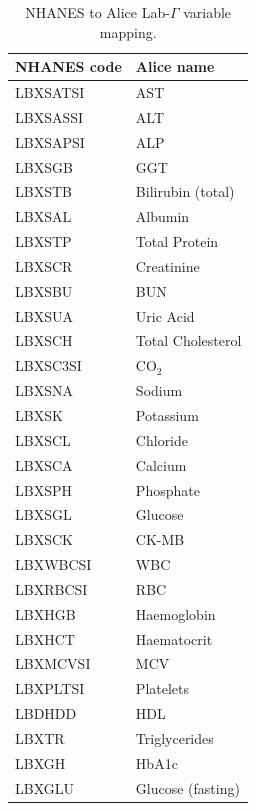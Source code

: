 \documentclass[aps,pre,twocolumn,superscriptaddress,floatfix]{revtex4-2}
\begin{document}
\begin{table}[h]
\centering
\caption{NHANES to Alice Lab-$\Gamma$ variable mapping.}
\label{tab:nhanes-map}
\begin{tabular}{ll}
\toprule
NHANES code & Alice name \\
\midrule
LBXSATSI & AST \\
LBXSASSI & ALT \\
LBXSAPSI & ALP \\
LBXSGB   & GGT \\
LBXSTB   & Bilirubin (total) \\
LBXSAL   & Albumin \\
LBXSTP   & Total Protein \\
LBXSCR   & Creatinine \\
LBXSBU   & BUN \\
LBXSUA   & Uric Acid \\
LBXSCH   & Total Cholesterol \\
LBXSC3SI & CO$_2$ \\
LBXSNA   & Sodium \\
LBXSK    & Potassium \\
LBXSCL   & Chloride \\
LBXSCA   & Calcium \\
LBXSPH   & Phosphate \\
LBXSGL   & Glucose \\
LBXSCK   & CK-MB \\
LBXWBCSI & WBC \\
LBXRBCSI & RBC \\
LBXHGB   & Haemoglobin \\
LBXHCT   & Haematocrit \\
LBXMCVSI & MCV \\
LBXPLTSI & Platelets \\
LBDHDD   & HDL \\
LBXTR    & Triglycerides \\
LBXGH    & HbA1c \\
LBXGLU   & Glucose (fasting) \\
\bottomrule
\end{tabular}
\end{table}
\end{document}
